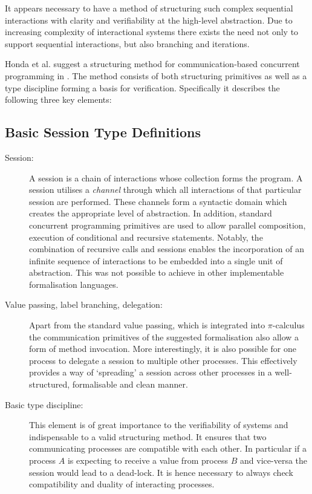 It appears necessary to have a method of structuring such complex sequential interactions with clarity and verifiability at the high-level abstraction. Due to increasing complexity of interactional systems there exists the need not only to support sequential interactions, but also branching and iterations.

Honda et al. suggest a structuring method for communication-based concurrent programming in \cite{language_primitives}. The method consists of both structuring primitives as well as a type discipline forming a basis for verification. Specifically it describes the following three key elements:

\subsection{Basic Session Type Definitions}
\begin{description}
  \item[Session:] A session is a chain of interactions whose collection forms the program. A session utilises a \textit{channel} through which all interactions of that particular session are performed. These channels form a syntactic domain which creates the appropriate level of abstraction. In addition, standard concurrent programming primitives are used to allow parallel composition, execution of conditional and recursive statements. Notably, the combination of recursive calls and sessions enables the incorporation of an infinite sequence of interactions to be embedded into a single unit of abstraction. This was not possible to achieve in other implementable formalisation languages.
  \item[Value passing, label branching, delegation:] Apart from the standard value passing, which is integrated into $\pi$-calculus the communication primitives of the suggested formalisation also allow a form of method invocation. More interestingly, it is also possible for one process to delegate a session to multiple other processes. This effectively provides a way of `spreading' a session across other processes in a well-structured, formalisable and clean manner.
  \item[Basic type discipline:] This element is of great importance to the verifiability of systems and indispensable to a valid structuring method. It ensures that two communicating processes are compatible with each other. In particular if a process $A$ is expecting to receive a value from process $B$ and vice-versa the session would lead to a dead-lock. It is hence necessary to always check compatibility and duality of interacting processes.
\end{description}

